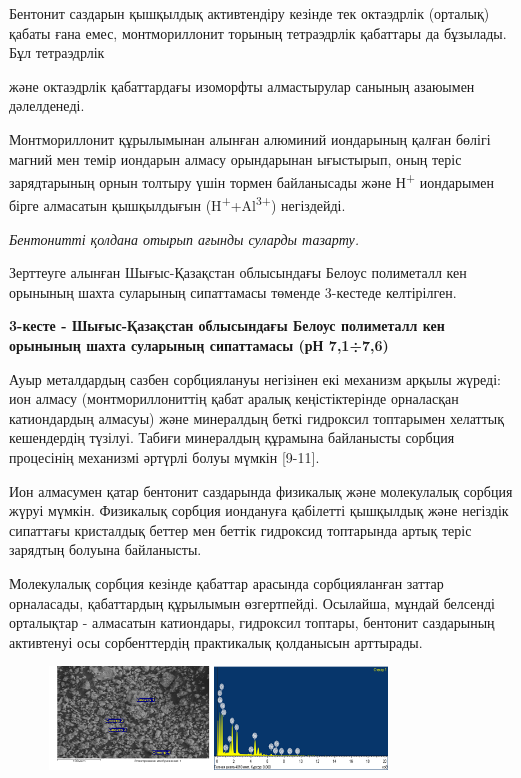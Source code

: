 Бентонит саздарын қышқылдық активтендіру кезінде тек октаэдрлік
(орталық) қабаты ғана емес, монтмориллонит торының тетраэдрлік қабаттары
да бұзылады. Бұл тетраэдрлік

және октаэдрлік қабаттардағы изоморфты алмастырулар санының азаюымен
дәлелденеді.

Монтмориллонит құрылымынан алынған алюминий иондарының қалған бөлігі
магний мен темір иондарын алмасу орындарынан ығыстырып, оның теріс
зарядтарының орнын толтыру үшін тормен байланысады және
Н\textsuperscript{+} иондарымен бірге алмасатын қышқылдығын
(H\textsuperscript{+}+Al\textsuperscript{3+}) негіздейді.

\emph{Бентонитті қолдана отырып ағынды суларды тазарту.}

Зерттеуге алынған Шығыс-Қазақстан облысындағы Белоус полиметалл кен
орынының шахта суларының сипаттамасы төменде 3-кестеде келтірілген.

{\bfseries 3-кесте - Шығыс-Қазақстан облысындағы Белоус полиметалл кен
орынының шахта суларының сипаттамасы (рН 7,1÷7,6)}


Ауыр металдардың сазбен сорбциялануы негізінен екі механизм арқылы
жүреді: ион алмасу (монтмориллониттің қабат аралық кеңістіктерінде
орналасқан катиондардың алмасуы) және минералдың беткі гидроксил
топтарымен хелаттық кешендердің түзілуі. Табиғи минералдың құрамына
байланысты сорбция процесінің механизмі әртүрлі болуы мүмкін {[}9-11{]}.

Ион алмасумен қатар бентонит саздарында физикалық және молекулалық
сорбция жүруі мүмкін. Физикалық сорбция иондануға қабілетті қышқылдық
және негіздік сипаттағы кристалдық беттер мен беттік гидроксид
топтарында артық теріс зарядтың болуына байланысты.

Молекулалық сорбция кезінде қабаттар арасында сорбцияланған заттар
орналасады, қабаттардың құрылымын өзгертпейді. Осылайша, мұндай белсенді
орталықтар - алмасатын катиондары, гидроксил топтары, бентонит
саздарының активтенуі осы сорбенттердің практикалық қолданысын
арттырады.

\begin{figure}[H]
	\centering
	\includegraphics[width=0.8\textwidth]{assets/1048}
	\caption*{}
\end{figure}

